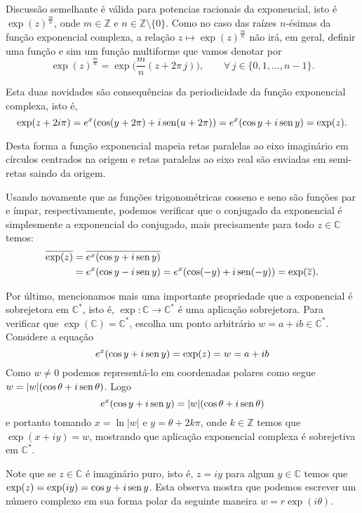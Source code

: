 Discussão semelhante é válida para potencias racionais da exponencial, isto é 
$\exp(z)^{\frac{m}{n}}$, onde $m\in\mathbb{Z}$ e $n\in \mathbb{Z}\setminus\{0\}$.
Como no caso das raízes $n$-ésimas da função exponencial complexa, a relação 
$z\longmapsto \exp(z)^{\frac{m}{n}}$ não irá, em geral, definir uma função e 
sim um função multiforme que vamos denotar por 
\[
\exp(z)^{\frac{m}{n}} = \exp\Big( \frac{m}{n}(z+2\pi\, j)  \Big),
\qquad \forall\, j\in\{0,1,\ldots,n-1\}.
\]


Esta duas novidades são consequências da periodicidade da função 
exponencial complexa, isto é, 
\[
\exp(z+2i\pi) = e^{x}(\cos(y+2\pi)+i\operatorname{sen}(u+2\pi))=e^{x}(\cos y+i\operatorname{sen} y) = \exp(z).
\]

Desta forma a função exponencial mapeia retas paralelas ao eixo imaginário em 
círculos centrados na origem e retas paralelas ao eixo real são enviadas em
semi-retas saindo da origem. 


\bigskip 
Usando novamente que as funções trigonométricas cosseno e seno são 
funções par e ímpar, respectivamente, podemos verificar que o conjugado 
da exponencial é simplesmente a exponencial do conjugado, mais precisamente 
para todo $z\in\mathbb{C}$ temos:
\begin{align*}
\overline{\exp(z)}
&=
\overline{e^{x}(\cos y+i\operatorname{sen} y)}
\\
&=
e^{x}(\cos y-i\operatorname{sen} y)
=
e^{x}(\cos(-y)+i\operatorname{sen}(-y))
=
\exp(\overline{z}).
\end{align*}



Por último, mencionamos mais uma importante propriedade que a
exponencial é sobrejetora em $\mathbb{C}^{*}$, isto é,
$\exp:\mathbb{C}\to\mathbb{C}^{*}$ é uma aplicação sobrejetora.
Para verificar que $\exp(\mathbb{C})=\mathbb{C}^{*}$, escolha
um ponto arbitrário $w=a+ib\in \mathbb{C}^{*}$.
Considere a equação 
\[
e^{x}(\cos y+i\operatorname{sen} y) = \exp(z) = w = a+ib
\]
Como $w\neq 0$ podemos representá-lo em coordenadas polares como segue
$w=|w|(\cos \theta+i\operatorname{sen}\theta)$. Logo
\[
e^{x}(\cos y+i\operatorname{sen} y) = |w|(\cos \theta+i\operatorname{sen}\theta)
\]
e portanto tomando $x=\ln |w|$ e $y=\theta +2k\pi$, onde $k\in \mathbb{Z}$
temos que $\exp(x+iy)=w$,
mostrando que aplicação exponencial complexa é sobrejetiva em $\mathbb{C}^{*}$.



Note que se $z\in\mathbb{C}$ é imaginário puro, isto é, $z=iy$ 
para algum $y\in\mathbb{C}$ temos que $\exp(z)=\exp(iy)=\cos y+i\operatorname{sen} y$.
Esta observa mostra que podemos escrever um número complexo em sua forma
polar da seguinte maneira $w=r\exp(i\theta)$. 

